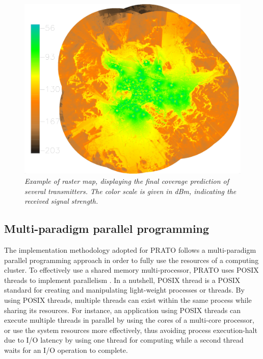 \begin{figure}
\centering

\includegraphics[width=0.95\columnwidth]{04-framework_design_and_implementation/img/final_coverage}

\caption{\textit{\emph{Example of raster map, displaying the final coverage
prediction of several transmitters. The color scale is given in dBm,
indicating the received signal strength.\label{fig:output_raster_example}}}}
\end{figure}



\subsection{Multi-paradigm parallel programming}

The implementation methodology adopted for PRATO follows a multi-paradigm
parallel programming approach in order to fully use the resources
of a computing cluster. To effectively use a shared memory multi-processor,
PRATO uses POSIX threads to implement parallelism \cite{Butenhof_Programming.with.POSIX.threads:1997}.
In a nutshell, POSIX thread is a POSIX standard for creating and manipulating
light-weight processes or threads. By using POSIX threads, multiple
threads can exist within the same process while sharing its resources.
For instance, an application using POSIX threads can execute multiple
threads in parallel by using the cores of a multi-core processor,
or use the system resources more effectively, thus avoiding process
execution-halt due to I/O latency by using one thread for computing
while a second thread waits for an I/O operation to complete. 

